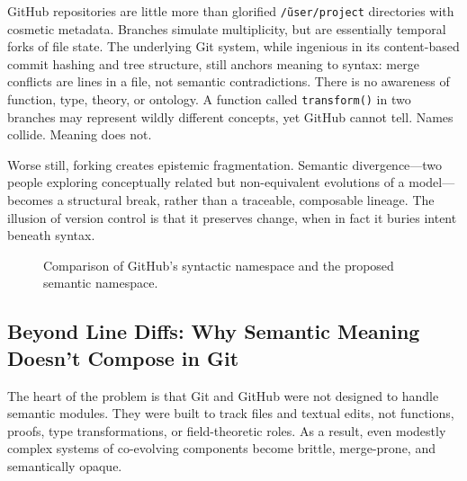\documentclass[12pt]{article}
\begin{document}
GitHub repositories are little more than glorified \texttt{\~/user/project} directories with cosmetic metadata. Branches simulate multiplicity, but are essentially temporal forks of file state. The underlying Git system, while ingenious in its content-based commit hashing and tree structure, still anchors meaning to syntax: merge conflicts are lines in a file, not semantic contradictions. There is no awareness of function, type, theory, or ontology. A function called \texttt{transform()} in two branches may represent wildly different concepts, yet GitHub cannot tell. Names collide. Meaning does not.

Worse still, forking creates epistemic fragmentation. Semantic divergence—two people exploring conceptually related but non-equivalent evolutions of a model—becomes a structural break, rather than a traceable, composable lineage. The illusion of version control is that it preserves change, when in fact it buries intent beneath syntax.

\begin{figure}[h]
    \centering
    \caption{Comparison of GitHub's syntactic namespace and the proposed semantic namespace.}
\end{figure}

\subsection{Beyond Line Diffs: Why Semantic Meaning Doesn’t Compose in Git}
The heart of the problem is that Git and GitHub were not designed to handle semantic modules. They were built to track files and textual edits, not functions, proofs, type transformations, or field-theoretic roles. As a result, even modestly complex systems of co-evolving components become brittle, merge-prone, and semantically opaque.
\end{document}
